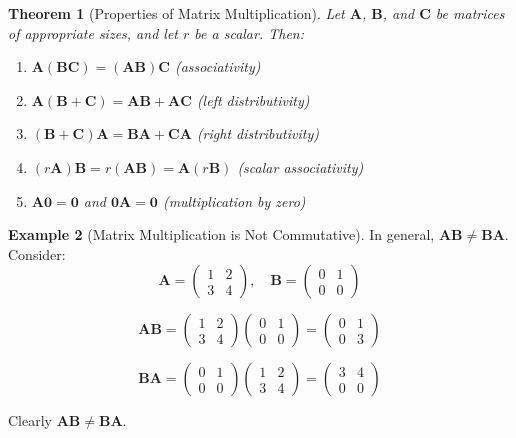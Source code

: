 \documentclass[12pt]{article}
\numberwithin{equation}{section}
\newcommand{\mat}[1]{\mathbf{#1}}        %
\theoremstyle{plain}
\newtheorem{theorem}{Theorem}[section]
\theoremstyle{definition}
\newtheorem{example}[theorem]{Example}
\theoremstyle{remark}
\begin{document}
\begin{theorem}[Properties of Matrix Multiplication]
Let $\mat{A}$, $\mat{B}$, and $\mat{C}$ be matrices of appropriate sizes, and let $r$ be a scalar. Then:
\begin{enumerate}
\item $\mat{A}(\mat{B}\mat{C}) = (\mat{A}\mat{B})\mat{C}$ (associativity)
\item $\mat{A}(\mat{B} + \mat{C}) = \mat{A}\mat{B} + \mat{A}\mat{C}$ (left distributivity)
\item $(\mat{B} + \mat{C})\mat{A} = \mat{B}\mat{A} + \mat{C}\mat{A}$ (right distributivity)
\item $(r\mat{A})\mat{B} = r(\mat{A}\mat{B}) = \mat{A}(r\mat{B})$ (scalar associativity)
\item $\mat{A}\mat{0} = \mat{0}$ and $\mat{0}\mat{A} = \mat{0}$ (multiplication by zero)
\end{enumerate}
\end{theorem}

\begin{example}[Matrix Multiplication is Not Commutative]
In general, $\mat{A}\mat{B} \neq \mat{B}\mat{A}$. Consider:
$$\mat{A} = \begin{pmatrix} 1 & 2 \\ 3 & 4 \end{pmatrix}, \quad \mat{B} = \begin{pmatrix} 0 & 1 \\ 0 & 0 \end{pmatrix}$$

$$\mat{A}\mat{B} = \begin{pmatrix} 1 & 2 \\ 3 & 4 \end{pmatrix}\begin{pmatrix} 0 & 1 \\ 0 & 0 \end{pmatrix} = \begin{pmatrix} 0 & 1 \\ 0 & 3 \end{pmatrix}$$

$$\mat{B}\mat{A} = \begin{pmatrix} 0 & 1 \\ 0 & 0 \end{pmatrix}\begin{pmatrix} 1 & 2 \\ 3 & 4 \end{pmatrix} = \begin{pmatrix} 3 & 4 \\ 0 & 0 \end{pmatrix}$$

Clearly $\mat{A}\mat{B} \neq \mat{B}\mat{A}$.
\end{example}
\end{document}
